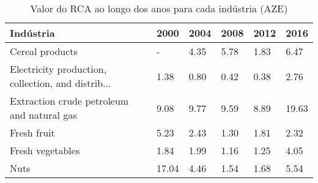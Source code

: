 \begin{table}
\centering
\caption{Valor do RCA ao longo dos anos para cada indústria (AZE)}
\label{tab:ex3-tempo-AZE}
\begin{tabular}{p{6cm}p{1.5cm}p{1.5cm}p{1.5cm}p{1.5cm}p{1.5cm}}
\toprule
                                         Indústria &  2000 & 2004 & 2008 & 2012 &  2016 \\
\midrule
                                   Cereal products &     - & 4.35 & 5.78 & 1.83 &  6.47 \\
Electricity production, collection, and distrib... &  1.38 & 0.80 & 0.42 & 0.38 &  2.76 \\
        Extraction crude petroleum and natural gas &  9.08 & 9.77 & 9.59 & 8.89 & 19.63 \\
                                       Fresh fruit &  5.23 & 2.43 & 1.30 & 1.81 &  2.32 \\
                                  Fresh vegetables &  1.84 & 1.99 & 1.16 & 1.25 &  4.05 \\
                                              Nuts & 17.04 & 4.46 & 1.54 & 1.68 &  5.54 \\
\bottomrule
\end{tabular}
\end{table}
